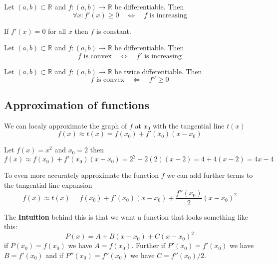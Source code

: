 \begin{theorem}
    Let $(a, b) \subset \mathbb{R}$ and $f: (a, b) \to \mathbb{R}$ be differentiable. Then 
    $$\forall x: f'(x) \geq 0 \quad \iff \quad f \text{ is increasing}$$
\end{theorem}

\begin{remark}
    If $f'(x) = 0$ for all $x$ then $f$ is constant.
\end{remark}

\begin{theorem}
    Let $(a, b) \subset \mathbb{R}$ and $f: (a, b) \to \mathbb{R}$ be differentiable. Then 
    $$f \text{ is convex} \quad \iff \quad f' \text{ is increasing}$$
\end{theorem}

\begin{theorem}
    Let $(a, b) \subset \mathbb{R}$ and $f: (a, b) \to \mathbb{R}$ be twice differentiable. Then 
    $$f \text{ is convex} \quad \iff \quad f'' \geq 0$$
\end{theorem}

\subsection{Approximation of functions}

\begin{lemma}
    We can localy approximate the graph of $f$ at $x_0$ with the tangential line $t(x)$
    $$f(x) \approx t(x) = f(x_0) + f'(x_0)(x-x_0)$$
\end{lemma}

\begin{example}
    Let $f(x) = x^2$ and $x_0 = 2$ then 
    $$f(x) \approx f(x_0) + f'(x_0)(x-x_0) = 2^2 + 2(2)(x-2) = 4 + 4(x-2) = 4x - 4$$
\end{example}

\begin{lemma}
    To even more accurately approximate the function $f$ we can add further terms to the tangential line expansion
    $$f(x) \approx t(x) = f(x_0) + f'(x_0)(x-x_0) + \frac{f''(x_0)}{2}(x-x_0)^2$$
\end{lemma}

\begin{remark}
    The \textbf{Intuition} behind this is that we want a function that looks something like this:
    $$P(x) = A + B(x-x_0) + C(x-x_0)^2$$
    if $P(x_0) = f(x_0)$ we have $A = f(x_0)$. Further if $P'(x_0) = f'(x_0)$ we have $B = f'(x_0)$ and if $P''(x_0) = f''(x_0)$ we have $C = f''(x_0)/2$.
\end{remark}

